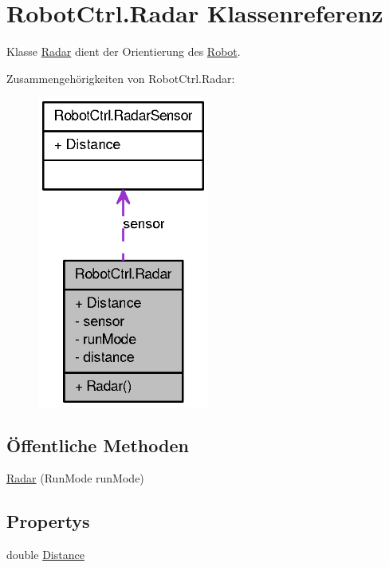\hypertarget{class_robot_ctrl_1_1_radar}{
\section{RobotCtrl.Radar Klassenreferenz}
\label{class_robot_ctrl_1_1_radar}
}


Klasse \hyperlink{class_robot_ctrl_1_1_radar}{Radar} dient der Orientierung des \hyperlink{class_robot_ctrl_1_1_robot}{Robot}.  




Zusammengehörigkeiten von RobotCtrl.Radar:\nopagebreak
\begin{figure}[H]
\begin{center}
\leavevmode
\includegraphics[width=160pt]{class_robot_ctrl_1_1_radar__coll__graph}
\end{center}
\end{figure}
\subsection*{Öffentliche Methoden}
\begin{DoxyCompactItemize}
\item 
\hyperlink{class_robot_ctrl_1_1_radar_a40cb0f884bc4dc22d1e5dc5d05c947b2}{Radar} (RunMode runMode)
\end{DoxyCompactItemize}
\subsection*{Propertys}
\begin{DoxyCompactItemize}
\item 
double \hyperlink{class_robot_ctrl_1_1_radar_a0339d462806cb7fc3759d850b5564dd9}{Distance}
\end{DoxyCompactItemize}


